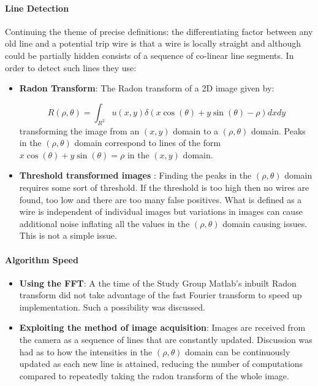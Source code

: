\documentclass[11pt]{article} %
\begin{document}
	\paragraph{Line Detection}
	Continuing the theme of precise definitions: the differentiating factor between any old line and a potential trip wire is that a wire is locally straight and although could be partially hidden consists of a sequence of co-linear line segments. In order to detect such lines they use: 
		\begin{itemize}
		\item \textbf{Radon Transform}: The Radon transform of a 2D image given by:
		
		\begin{equation}
			R(\rho, \theta)=\int_{R^2} u(x,y)\delta(x\cos(\theta)+y\sin(\theta)-\rho) dx dy 					
		\end{equation}
		transforming the image from an $(x,y) $ domain to a $ (\rho, \theta)$ domain. Peaks in the $ (\rho, \theta)$ domain correspond to lines of the form $ x\cos(\theta)+y\sin(\theta)=\rho$ in the $(x,y) $ domain. 
		\item \textbf{Threshold transformed images }: Finding the peaks in the $ (\rho, \theta)$ domain requires some sort of threshold. If the threshold is too high then no wires are found, too low and there are too many false positives. What is defined as a wire is independent of individual images but variations in images can cause additional noise inflating all the values in the $ (\rho, \theta)$ domain causing issues. This is not a simple issue. 
	\end{itemize}
	\paragraph{Algorithm Speed}
		\begin{itemize}
		\item \textbf{Using the FFT}: A the time of the Study Group Matlab's inbuilt Radon transform did not take advantage of the fast Fourier transform to speed up implementation. Such a possibility was discussed. 
		\item \textbf{Exploiting the method of image acquisition}: Images are received from the camera as a sequence of lines that are constantly updated. Discussion was had as to how the intensities in the $ (\rho, \theta)$ domain can be continuously updated as each new line is attained, reducing the number of computations compared to repeatedly taking the radon transform of the whole image. 
	\end{itemize}
	
\end{document}
